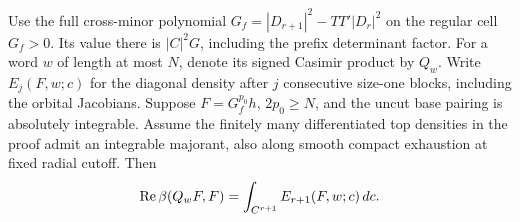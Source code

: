\begin{auxlemma}\label{lem:radial-cutoff-transfer}
Use the full cross-minor polynomial \(G_f=|D_{r+1}|^2-TT'|D_r|^2\) on the regular cell \(G_f>0\). Its value there is \(|C|^2G\), including the prefix determinant factor. For a word \(w\) of length at most \(N\), denote its signed Casimir product by \(Q_w\). Write \(E_j(F,w;c)\) for the diagonal density after \(j\) consecutive size-one blocks, including the orbital Jacobians. Suppose \(F=G_f^{p_0}h\), \(2p_0\ge N\), and the uncut base pairing is absolutely integrable. Assume the finitely many differentiated top densities in the proof admit an integrable majorant, also along smooth compact exhaustion at fixed radial cutoff. Then
\[
 \operatorname{Re}\beta(Q_wF,F)
       =\int_{C^{r+1}} E_{r+1}(F,w;c)\,dc .
\]
\end{auxlemma}
